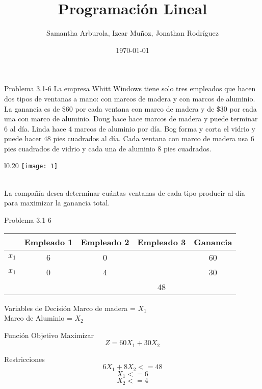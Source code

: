 \documentclass{beamer}
\author{Samantha Arburola, Izcar Muñoz, Jonathan Rodr\'iguez}
\title{Programaci\'on Lineal}
\date{\today}
\begin{document}
\titlepageframe

\begin{frame}[t,fragile]{Problema 3.1-6}
La empresa Whitt Windows tiene solo tres empleados que hacen dos tipos de ventanas a mano: con marcos de madera y con marcos de aluminio. La ganancia es de \$60 por cada ventana con marco de madera y de \$30 por cada una con marco de aluminio. Doug hace hace marcos de madera y puede terminar 6 al d\'ia. Linda hace 4  marcos de aluminio por d\'ia. Bog forma y corta el vidrio y puede hacer 48 pies cuadrados al d\'ia. Cada ventana con marco de madera usa 6 pies cuadrados de vidrio y cada una de aluminio 8 pies cuadrados.\\ 
\begin{wrapfigure}{l}{0.20\textwidth}
    \centering
    \texttt{[image: 1]}
\end{wrapfigure}\\
La compañ\'ia desea determinar cu\'antas ventanas de cada tipo producir al d\'ia para maximizar la ganancia total.\\
\end{frame}
\begin{frame}[t,fragile]{Problema 3.1-6}
\begin{tabular}{|c|c|c|c|c|}
\hline 
  & Empleado 1 & Empleado 2 & Empleado 3 & Ganancia \\ 
\hline 
\(x_{1}\) & 6 & 0 &   & 60 \\ 
\hline 
\(x_{1}\) & 0 & 4 &   &30 \\ 
\hline 
 &  &  & 48 &  \\ 
\hline 
\end{tabular} 

\end{frame}

\begin{frame}[fragile]{Variables de Decisi\'on}
Marco de madera  = \(X_{1}\) \\
Marco de Aluminio = \(X_{2}\)
\end{frame}

\begin{frame}[fragile]{Funci\'on Objetivo}
Maximizar\\
\[Z = 60X_{1} + 30X_{2}\]
\end{frame}

\begin{frame}[fragile]{Restricciones}
\[6X_{1} + 8X_{2} <= 48\]
\[  X_{1} <= 6\]
\[  X_{2} <= 4\]
\end{frame}
\end{document}
